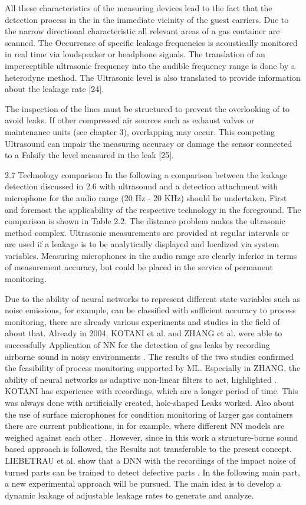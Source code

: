 All these characteristics of the measuring devices lead to the fact that the detection process in the
in the immediate vicinity of the guest carriers. 
Due to the narrow directional characteristic all relevant areas of a gas container are scanned. 
The Occurrence of specific leakage frequencies is acoustically monitored in real time via loudspeaker
or headphone signals. 
The translation of an imperceptible ultrasonic frequency into the audible frequency range is done by a heterodyne method.
The Ultrasonic level is also translated to provide information about the leakage rate [24].


The inspection of the lines must be structured to prevent the overlooking of
to avoid leaks. If other compressed air sources such as exhaust valves or
maintenance units (see chapter 3), overlapping may occur. This competing
Ultrasound can impair the measuring accuracy or damage the sensor connected to a
Falsify the level measured in the leak [25].

2.7 Technology comparison
In the following a comparison between the leakage detection discussed in 2.6 with
ultrasound and a detection attachment with microphone for the audio range (20 Hz - 20
KHz) should be undertaken. First and foremost the applicability of the respective
technology in the foreground. The comparison is shown in Table 2.2.
The distance problem makes the ultrasonic method complex. Ultrasonic measurements
are provided at regular intervals or are used if a leakage
is to be analytically displayed and localized via system variables. Measuring microphones
in the audio range are clearly inferior in terms of measurement accuracy, but could
be placed in the service of permanent monitoring.





Due to the ability of neural networks to represent different state variables such as noise emissions, for example, can be classified with sufficient accuracy to process monitoring, there are already various experiments and studies in the field of about that. 
Already in 2004, KOTANI et al. and ZHANG et al. were able to successfully Application of NN for the detection of gas leaks by recording airborne sound in noisy environments \simpletodo{[REF 35]}. 
The results of the two studies confirmed the feasibility of process monitoring supported by ML.
Especially in ZHANG, the ability of neural networks as adaptive non-linear filters to act, highlighted \simpletodo{[REF]}. 
KOTANI has experience with recordings, which are a longer period of time. This was always done with artificially created, hole-shaped Leaks worked.
Also about the use of surface microphones for condition monitoring of larger gas containers there are current publications, in for example, where different NN models are weighed against each other \simpletodo{[REF 36]}.
However, since in this work a structure-borne sound based approach is followed, the Results not transferable to the present concept.
LIEBETRAU et al. show that a DNN with the recordings of the impact noise of turned parts can be trained to detect defective parts \simpletodo{[REF 30]}. 
In the following main part, a new experimental approach will be pursued. The main idea is to develop a dynamic leakage of adjustable leakage rates to generate and analyze.
